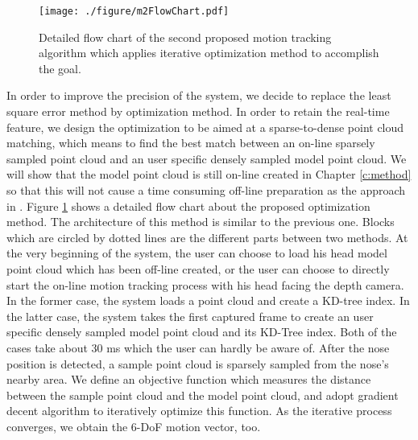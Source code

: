 \begin{figure}
\centering
\texttt{[image: ./figure/m2FlowChart.pdf]}
\caption{Detailed flow chart of the second proposed motion tracking algorithm which applies iterative optimization method to accomplish the goal.}
\label{f:m2 flow chart}
\end{figure}
\label{s:architecture}

In order to improve the precision of the system, we decide to replace the least square error method by optimization method. In order to retain the real-time feature, we design the optimization to be aimed at a sparse-to-dense point cloud matching, which means to find the best match between an on-line sparsely sampled point cloud and an user specific densely sampled model point cloud. We will show that the model point cloud is still on-line created in Chapter \ref{c:method} so that this will not cause a time consuming off-line preparation as the approach in \cite{Weise:11:RPBFA}. Figure \ref{f:m2 flow chart} shows a detailed flow chart about the proposed optimization method. The architecture of this method is similar to the previous one. Blocks which are circled by dotted lines are the different parts between two methods. At the very beginning of the system, the user can choose to load his head model point cloud which has been off-line created, or the user can choose to directly start the on-line motion tracking process with his head facing the depth camera. In the former case, the system loads a point cloud and create a KD-tree index. In the latter case, the system takes the first captured frame to create an user specific densely sampled model point cloud and its KD-Tree index. Both of the cases take about 30 ms which the user can hardly be aware of. After the nose position is detected, a sample point cloud is sparsely sampled from the nose's nearby area. We define an objective function which measures the distance between the sample point cloud and the model point cloud, and adopt gradient decent algorithm to iteratively optimize this function. As the iterative process converges, we obtain the 6-DoF motion vector, too. 